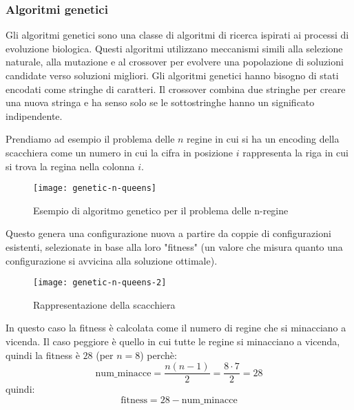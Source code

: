 \documentclass[a4paper]{article}
\begin{document}
\subsubsection{Algoritmi genetici}
Gli algoritmi genetici sono una classe di algoritmi di ricerca ispirati ai
processi di evoluzione biologica. Questi algoritmi utilizzano meccanismi simili
alla selezione naturale, alla mutazione e al crossover per evolvere una popolazione
di soluzioni candidate verso soluzioni migliori. Gli algoritmi genetici hanno bisogno
di stati encodati come stringhe di caratteri. Il crossover combina due stringhe
per creare una nuova stringa e ha senso solo se le sottostringhe hanno un significato
indipendente.
\begin{example}
  Prendiamo ad esempio il problema delle \( n \) regine in cui si ha un encoding
  della scacchiera come un numero in cui la cifra in posizione \( i \) rappresenta
  la riga in cui si trova la regina nella colonna \( i \).
  \begin{figure}[H]
    \centering
    \texttt{[image: genetic-n-queens]}
    \caption{Esempio di algoritmo genetico per il problema delle n-regine}
  \end{figure}
  \noindent
  Questo genera una configurazione nuova a partire da coppie di configurazioni
  esistenti, selezionate in base alla loro "fitness" (un valore che misura
  quanto una configurazione si avvicina alla soluzione ottimale).
  \begin{figure}[H]
    \centering
    \texttt{[image: genetic-n-queens-2]}
    \caption{Rappresentazione della scacchiera}
  \end{figure}
  \noindent
  In questo caso la fitness è calcolata come il numero di regine che si minacciano
  a vicenda. Il caso peggiore è quello in cui tutte le regine si minacciano a vicenda,
  quindi la fitness è \( 28 \) (per \( n = 8 \)) perchè:
  \[
    \text{num\_minacce} = \frac{n(n-1)}{2} = \frac{8 \cdot 7}{2} = 28
  \] 
  quindi:
  \[
    \text{fitness} = 28 - \text{num\_minacce}
  \] 
\end{example}
\end{document}
